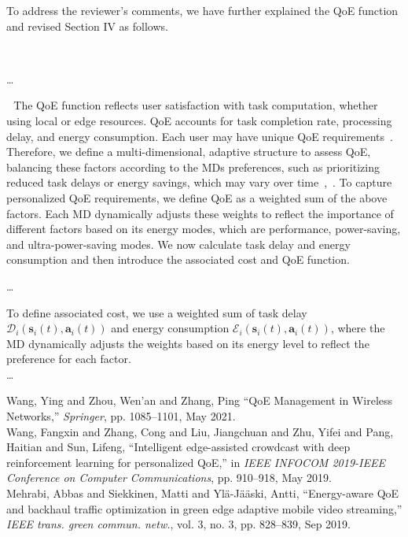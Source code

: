 \documentclass[12pt,draftclsnofoot,onecolumn]{IEEEtran}
\newcommand{\rev}[1]{{\color{blue}#1}} %
\newcommand{\rev}[1]{#1}
\newenvironment{my}[2]%
{\begin{list}{}%
{\setlength{\rightmargin}{#1}\setlength{\leftmargin}{#2}}%


 \item[]{}

} {\end{list}}
\begin{document}
\begin{enumerate}
	To address the reviewer's comments, we have further explained the QoE function and revised Section IV as follows.
	
	
	
			\begin{my}{1cm}{1cm}
		\rev{
			{\ 
				
				\dots 
				
\,\,\,\,The QoE function reflects user satisfaction with task computation, whether using local or edge resources. QoE accounts for task completion rate, processing delay, and energy consumption. Each user may have unique QoE requirements~\cite{wang2017qoe}. Therefore, we define a multi-dimensional, adaptive structure to assess QoE, balancing these factors according to the MDs preferences, such as prioritizing reduced task delays or energy savings, which may vary over time~\cite{wang2019intelligent},~\cite{mehrabi2019energy}. To capture personalized QoE requirements, we define QoE as a weighted sum of the above factors. Each MD dynamically adjusts these weights to reflect the importance of different factors based on its energy modes, which are performance, power-saving, and ultra-power-saving modes. We now calculate task delay and energy consumption and then introduce the associated cost and QoE function.
								
				\dots
								
				To define associated cost, we use a weighted sum of task delay $\mathcal{D}_i(\boldsymbol{s}_i(t),\boldsymbol{a}_i(t))$ and energy consumption $\mathcal{E}_i(\boldsymbol{s}_i(t),\boldsymbol{a}_i(t))$, where the MD dynamically adjusts the weights based on its energy level to reflect the preference for each factor. \\\dots
}}
	\end{my}




\begin{my}{1cm}{1cm}
	\rev{
		{\small
			\noindent\hspace{-0.5mm}\cite{wang2017qoe} Wang, Ying and Zhou, Wen'an and Zhang, Ping ``QoE Management in Wireless Networks,'' \textit{Springer}, pp. 1085--1101, May 2021.\\[10pt]
			\cite{wang2019intelligent} Wang, Fangxin and Zhang, Cong and Liu, Jiangchuan and Zhu, Yifei and Pang, Haitian and Sun, Lifeng, ``Intelligent edge-assisted crowdcast with deep reinforcement learning for personalized QoE,'' in \textit{IEEE INFOCOM 2019-IEEE Conference on Computer Communications}, pp. 910--918, May 2019.\\[10pt]
			\cite{mehrabi2019energy} Mehrabi, Abbas and Siekkinen, Matti and Yl{\"a}-J{\"a}{\"a}ski, Antti, ``Energy-aware QoE and backhaul traffic optimization in green edge adaptive mobile video streaming,'' \textit{ IEEE trans. green commun. netw.}, vol. 3, no. 3, pp. 828--839, Sep 2019.}\\}
\end{my}\vspace{6mm}


\end{enumerate}
\end{document}
